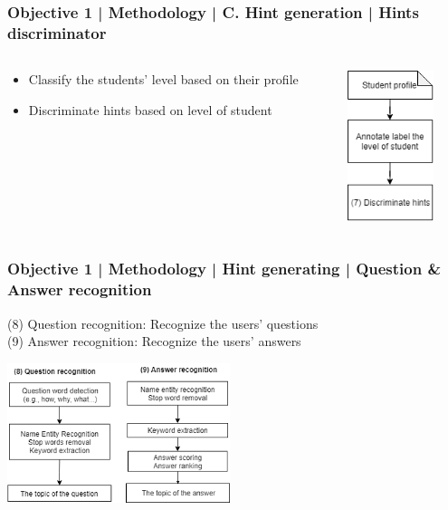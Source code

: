 \documentclass{beamer}
\begin{document}
\begin{frame}
\frametitle{Objective 1 | Methodology | C. Hint generation | Hints discriminator }
\begin{columns}
	
	\begin{column}{.55\textwidth}
		\begin{itemize}
			\item Classify the students' level based on their profile
			\item Discriminate hints based on level of student
			
		\end{itemize}
		
	\end{column}
	\begin{column}{.55\textwidth}
		\includegraphics[width=25mm]{hd1.png}
	\end{column}
\end{columns}
\end{frame}
\begin{frame}
\frametitle{Objective 1 | Methodology | Hint generating | Question \& Answer recognition }
(8) Question recognition: Recognize the users' questions\\
(9) Answer recognition: Recognize the users' answers
\begin{center}
		\includegraphics[width=65mm]{qa3.png}
\end{center}
\end{frame}
	
\end{document}
